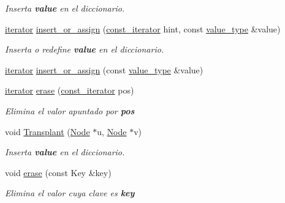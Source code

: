 \begin{Indent}
\begin{DoxyCompactItemize}
\begin{DoxyCompactList}\small\item\em Inserta {\bfseries value} en el diccionario. \end{DoxyCompactList}\item 
\hyperlink{classaed2_1_1map_1_1iterator}{iterator} \hyperlink{classaed2_1_1map_a2ef6723c183916276b0afc4a4c721475_a2ef6723c183916276b0afc4a4c721475}{insert\+\_\+or\+\_\+assign} (\hyperlink{classaed2_1_1map_1_1const__iterator}{const\+\_\+iterator} hint, const \hyperlink{classaed2_1_1map_a719db98e0ff9a837610f76be33264680_a719db98e0ff9a837610f76be33264680}{value\+\_\+type} \&value)
\begin{DoxyCompactList}\small\item\em Inserta o redefine {\bfseries value} en el diccionario. \end{DoxyCompactList}\item 
\hyperlink{classaed2_1_1map_1_1iterator}{iterator} \hyperlink{classaed2_1_1map_a9128a806713bcc999ebd8a97ab77e765_a9128a806713bcc999ebd8a97ab77e765}{insert\+\_\+or\+\_\+assign} (const \hyperlink{classaed2_1_1map_a719db98e0ff9a837610f76be33264680_a719db98e0ff9a837610f76be33264680}{value\+\_\+type} \&value)
\item 
\hyperlink{classaed2_1_1map_1_1iterator}{iterator} \hyperlink{classaed2_1_1map_ad8e796bf9c9c558e5ce6b61e116253fe_ad8e796bf9c9c558e5ce6b61e116253fe}{erase} (\hyperlink{classaed2_1_1map_1_1const__iterator}{const\+\_\+iterator} pos)
\begin{DoxyCompactList}\small\item\em Elimina el valor apuntado por {\bfseries pos} \end{DoxyCompactList}\item 
void \hyperlink{classaed2_1_1map_a6c9fb4a85c0e8d2de5dcbdbc0d695be5_a6c9fb4a85c0e8d2de5dcbdbc0d695be5}{Transplant} (\hyperlink{structaed2_1_1map_1_1Node}{Node} $\ast$u, \hyperlink{structaed2_1_1map_1_1Node}{Node} $\ast$v)
\begin{DoxyCompactList}\small\item\em Inserta {\bfseries value} en el diccionario. \end{DoxyCompactList}\item 
void \hyperlink{classaed2_1_1map_a2ffadb42cd5f0bc7b3752ff159b75334_a2ffadb42cd5f0bc7b3752ff159b75334}{erase} (const Key \&key)
\begin{DoxyCompactList}\small\item\em Elimina el valor cuya clave es {\bfseries key} \end{DoxyCompactList}\item 

\end{DoxyCompactItemize}
\end{Indent}
